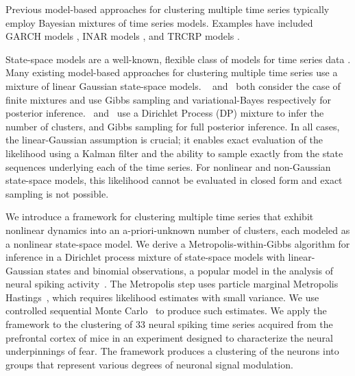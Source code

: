 \documentclass[twoside]{article}
\begin{document}
Previous model-based approaches for clustering multiple time series typically employ Bayesian mixtures of time series models.  Examples have included GARCH models \citep{bauwens2007bayesian}, INAR models \citep{roick2019clustering}, and TRCRP models \citep{saad2018temporally}.  


State-space models are a well-known, flexible class of models for time series data \citep{durbin2012time}.  Many existing model-based approaches for clustering multiple time series use a mixture of linear Gaussian state-space models. 
~\cite{inoue2006cluster} and~\cite{chiappa2007output} both consider the case of finite mixtures and use Gibbs sampling and variational-Bayes respectively for posterior inference.~\cite{nieto2014bayesian} and~\cite{middleton2014} use a Dirichlet Process (DP) mixture to infer the number of clusters, and Gibbs sampling for full posterior inference.
In all cases, the linear-Gaussian assumption is crucial; %
it enables exact evaluation of the likelihood using a Kalman filter and the ability to sample exactly from the state sequences underlying each of the time series. %
For nonlinear and non-Gaussian state-space models, this likelihood cannot be evaluated in closed form and exact sampling is not possible. 

We introduce a framework for clustering multiple time series that exhibit nonlinear dynamics into an a-priori-unknown number of clusters, each modeled as a nonlinear state-space model.  We derive a Metropolis-within-Gibbs algorithm for inference in a Dirichlet process mixture of state-space models with linear-Gaussian states and binomial observations, a popular model in the analysis of neural spiking activity~\citep{smith2003estimating}. The Metropolis step uses particle marginal Metropolis Hastings~\citep{andrieu2010particle}, which requires likelihood estimates with small variance. We use controlled sequential Monte Carlo~\citep{heng2017controlled} to produce such estimates. We apply the framework to the clustering of 33 neural spiking time series acquired from the prefrontal cortex of mice in an experiment designed to characterize the neural underpinnings of fear. The framework produces a clustering of the neurons into groups that represent {various degrees of neuronal signal modulation.}%
\end{document}
